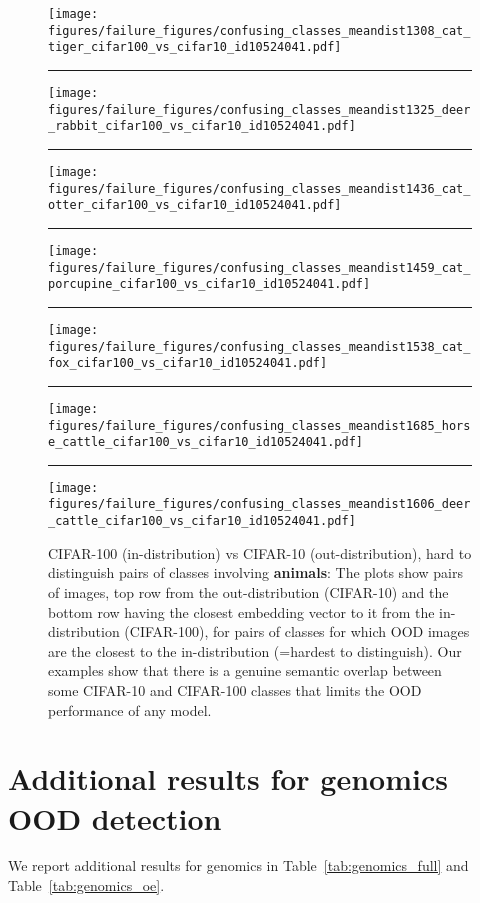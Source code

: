 \documentclass{article}
\begin{document}
\begin{figure}[ht]
	\centering
	\vspace{-5.0em}
	\texttt{[image: figures/failure\_figures/confusing\_classes\_meandist1308\_cat\_tiger\_cifar100\_vs\_cifar10\_id10524041.pdf]}
	\hrule
\texttt{[image: figures/failure\_figures/confusing\_classes\_meandist1325\_deer\_rabbit\_cifar100\_vs\_cifar10\_id10524041.pdf]}
\hrule
\texttt{[image: figures/failure\_figures/confusing\_classes\_meandist1436\_cat\_otter\_cifar100\_vs\_cifar10\_id10524041.pdf]}
\hrule
\texttt{[image: figures/failure\_figures/confusing\_classes\_meandist1459\_cat\_porcupine\_cifar100\_vs\_cifar10\_id10524041.pdf]}
\hrule
\texttt{[image: figures/failure\_figures/confusing\_classes\_meandist1538\_cat\_fox\_cifar100\_vs\_cifar10\_id10524041.pdf]}
\hrule
\texttt{[image: figures/failure\_figures/confusing\_classes\_meandist1685\_horse\_cattle\_cifar100\_vs\_cifar10\_id10524041.pdf]}
\hrule
\texttt{[image: figures/failure\_figures/confusing\_classes\_meandist1606\_deer\_cattle\_cifar100\_vs\_cifar10\_id10524041.pdf]}
	\caption{CIFAR-100 (in-distribution) vs CIFAR-10 (out-distribution), hard to distinguish pairs of classes involving \textbf{animals}: The plots show pairs of images, top row from the out-distribution (CIFAR-10) and the bottom row having the closest embedding vector to it from the in-distribution (CIFAR-100), for pairs of classes for which OOD images are the closest to the in-distribution (=hardest to distinguish). Our examples show that there is a genuine semantic overlap between some CIFAR-10 and CIFAR-100 classes that limits the OOD performance of any model.}
	\vspace{-1em}
	\label{fig:confusing_class_pairs_animals}
\end{figure}




\section{Additional results for genomics OOD detection}\label{app:genomics:results}

We report additional results for genomics in Table~\ref{tab:genomics_full} and Table~\ref{tab:genomics_oe}. 
\end{document}

